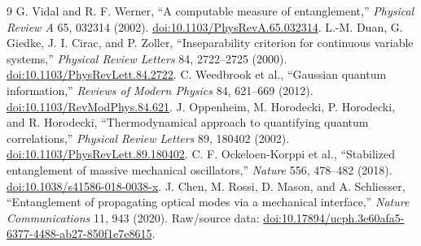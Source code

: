 \documentclass[9pt]{article}
\begin{document}
\begin{thebibliography}{9}
 G. Vidal and R. F. Werner, ``A computable measure of entanglement,'' \emph{Physical Review A} 65, 032314 (2002). \href{https://doi.org/10.1103/PhysRevA.65.032314}{doi:10.1103/PhysRevA.65.032314}.
 L.-M. Duan, G. Giedke, J. I. Cirac, and P. Zoller, ``Inseparability criterion for continuous variable systems,'' \emph{Physical Review Letters} 84, 2722--2725 (2000). \href{https://doi.org/10.1103/PhysRevLett.84.2722}{doi:10.1103/PhysRevLett.84.2722}.
 C. Weedbrook et al., ``Gaussian quantum information,'' \emph{Reviews of Modern Physics} 84, 621--669 (2012). \href{https://doi.org/10.1103/RevModPhys.84.621}{doi:10.1103/RevModPhys.84.621}.
 J. Oppenheim, M. Horodecki, P. Horodecki, and R. Horodecki, ``Thermodynamical approach to quantifying quantum correlations,'' \emph{Physical Review Letters} 89, 180402 (2002). \href{https://doi.org/10.1103/PhysRevLett.89.180402}{doi:10.1103/PhysRevLett.89.180402}.
 C. F. Ockeloen-Korppi et al., ``Stabilized entanglement of massive mechanical oscillators,'' \emph{Nature} 556, 478--482 (2018). \href{https://doi.org/10.1038/s41586-018-0038-x}{doi:10.1038/s41586-018-0038-x}.
 J. Chen, M. Rossi, D. Mason, and A. Schliesser, ``Entanglement of propagating optical modes via a mechanical interface,'' \emph{Nature Communications} 11, 943 (2020). Raw/source data: \href{https://doi.org/10.17894/ucph.3e60afa5-6377-4488-ab27-850f1e7e8615}{doi:10.17894/ucph.3e60afa5-6377-4488-ab27-850f1e7e8615}.
\end{thebibliography}
\end{document}
